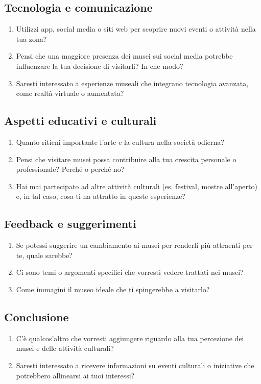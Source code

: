\documentclass[a4paper, 12pt]{article}
\begin{document}
\subsection{\textcolor{subsectioncolor}{Tecnologia e comunicazione}}

\begin{enumerate}
    \item Utilizzi app, social media o siti web per scoprire nuovi eventi o attività nella tua zona?
    \item Pensi che una maggiore presenza dei musei sui social media potrebbe influenzare la tua decisione di visitarli? In che modo?
    \item Saresti interessato a esperienze museali che integrano tecnologia avanzata, come realtà virtuale o aumentata?
\end{enumerate}

\subsection{\textcolor{subsectioncolor}{Aspetti educativi e culturali}}

\begin{enumerate}
    \item Quanto ritieni importante l'arte e la cultura nella società odierna?
    \item Pensi che visitare musei possa contribuire alla tua crescita personale o professionale? Perché o perché no?
    \item Hai mai partecipato ad altre attività culturali (es. festival, mostre all'aperto) e, in tal caso, cosa ti ha attratto in queste esperienze?
\end{enumerate}

\subsection{\textcolor{subsectioncolor}{Feedback e suggerimenti}}

\begin{enumerate}
    \item Se potessi suggerire un cambiamento ai musei per renderli più attraenti per te, quale sarebbe?
    \item Ci sono temi o argomenti specifici che vorresti vedere trattati nei musei?
    \item Come immagini il museo ideale che ti spingerebbe a visitarlo?
\end{enumerate}

\subsection{\textcolor{subsectioncolor}{Conclusione}}

\begin{enumerate}
    \item C'è qualcos'altro che vorresti aggiungere riguardo alla tua percezione dei musei e delle attività culturali?
    \item Saresti interessato a ricevere informazioni su eventi culturali o iniziative che potrebbero allinearsi ai tuoi interessi?
\end{enumerate}
\end{document}
